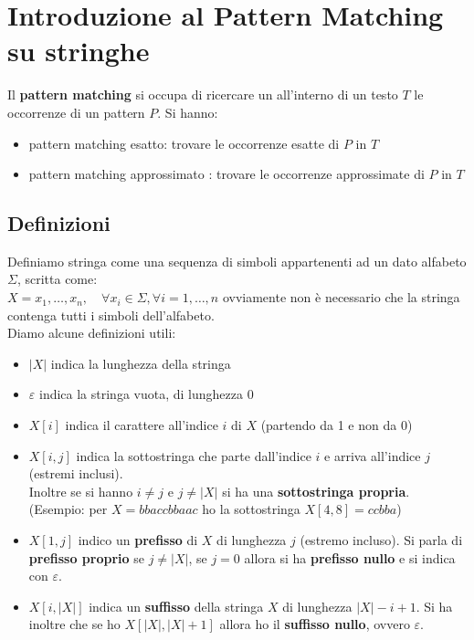 \section{Introduzione al Pattern Matching su stringhe}
Il \textbf{pattern matching} si occupa di ricercare un all'interno di un testo $T$ le occorrenze di un pattern $P$. Si hanno: 
\begin{itemize} 
    \item pattern matching esatto: trovare le occorrenze esatte di $P$ in $T$
    \item pattern matching approssimato : trovare le occorrenze approssimate di $P$ in $T$
\end{itemize}
\subsection{Definizioni}
Definiamo stringa come una sequenza di simboli appartenenti ad un dato alfabeto $\Sigma$, scritta come: \\
$X= x_1,\ldots,x_n,\quad \forall x_i\in \Sigma, \forall i = 1, \dots, n$ ovviamente non è necessario che la stringa contenga tutti i simboli dell'alfabeto.\\ 
Diamo alcune definizioni utili: 
\begin{itemize} 
    \item $|X|$ indica la lunghezza della stringa 
    \item $\varepsilon$ indica la stringa vuota, di lunghezza 0
    \item $X[i]$ indica il carattere all'indice $i$ di $X$ (partendo da 1 e non da 0) 
    \item $X[i,j]$ indica la sottostringa che parte dall'indice $i$ e arriva all'indice $j$ (estremi inclusi).  \\
    Inoltre se si hanno $i\neq j$ e $j\neq |X|$ si ha una \textbf{sottostringa propria}.\\ 
    (Esempio: per $X=bbaccbbaac$ ho la sottostringa $X[4,8]=ccbba$) 
    \item $X[1,j]$ indico un \textbf{prefisso} di $X$ di lunghezza $j$ (estremo incluso). 
    Si parla di \textbf{prefisso proprio} se $j \neq |X|$, se $j=0$ allora si ha \textbf{prefisso nullo} e si indica con $\varepsilon$.\\
    \item $X[i,|X|]$ indica un \textbf{suffisso} della stringa $X$ di lunghezza $|X|-i+1$. 
    Si ha inoltre che se ho $X[|X|,|X|+1]$ allora ho il \textbf{suffisso nullo}, ovvero $\varepsilon$.\\ 
\end{itemize}
